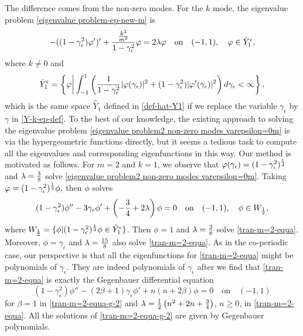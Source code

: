 \documentclass[1 [leqno, 11pt]{amsart}
\numberwithin{equation}{section}
\let\ep=\epsilon
\begin{document}
\begin{CJK*}{GBK}{song}
The difference comes from the non-zero modes. For the $k$ mode, the eigenvalue problem \eqref{eigenvalue problem-ep-new-m}
is
\begin{equation}\label{eigenvalue problem2 non-zero modes varepsilon=0m}
-((1-\gamma_\ep^2)\varphi')'+{{k^2\over m^2}\over1-\gamma_\ep^2}\varphi =2\lambda\varphi \quad \text{on}\quad (-1,1),\quad\varphi\in \hat Y_1^\ep,
\end{equation}
where $k\neq0$ and
\begin{align}\label{Y-k-ep-def}
\hat Y_1^\ep=\left\{\varphi\bigg|\int_{-1}^1\left({1\over1-\gamma_\ep^2}|\varphi(\gamma_\ep)|^2+(1-\gamma_\ep^2)|\varphi'(\gamma_\ep)|^2\right)d\gamma_\ep
<\infty \right\},
\end{align}
which is the same space
 $\hat Y_1$ defined in \eqref{def-hat-Y1} if we replace the variable $\gamma_\ep$ by $\gamma$ in \eqref{Y-k-ep-def}.
To the best of our knowledge, the existing approach to solving the eigenvalue problem \eqref{eigenvalue problem2 non-zero modes varepsilon=0m} is via the hypergeometric functions directly, but it seems a tedious task to compute all the eigenvalues and corresponding eigenfunctions in this way. Our method is motivated as follows. For $m=2$ and $k=1$, we observe that $\varphi(\gamma_\ep)=(1-\gamma_\ep^2)^{1\over 4}$ and $\lambda={3\over 8}$ solve \eqref{eigenvalue problem2 non-zero modes varepsilon=0m}. Taking
$
\varphi=(1-\gamma_\ep^2)^{1\over4}\phi,
$
then $\phi$ solves
\begin{equation}\label{tran-m=2-equa}
(1-\gamma_\ep^2)\phi''-3\gamma_\ep\phi'+\left(-{3\over4}+2\lambda\right)\phi =0 \quad \text{on}\quad (-1,1),\quad\phi\in W_{1\over 2},
\end{equation}
where $W_{1\over 2}=\{\phi|(1-\gamma_\ep^2)^{1\over4}\phi\in\hat Y_1^\ep\}$.
Then $\phi=1$ and $\lambda={3\over 8}$ solve \eqref{tran-m=2-equa}. Moreover, $\phi=\gamma_\ep$ and $\lambda={15\over 8}$ also solve \eqref{tran-m=2-equa}. As in the co-periodic case, our perspective is that all the eigenfunctions for \eqref{tran-m=2-equa}  might be polynomials of $\gamma_\ep$. They are indeed polynomials of $\gamma_\ep$ after we find that \eqref{tran-m=2-equa} is exactly the Gegenbauer differential equation
\begin{equation}\label{tran-m=2-equa-g-2}
(1-\gamma_\ep^2)\phi''-(2\beta+1)\gamma_\ep\phi'+n(n+2\beta)\phi =0 \quad \text{on}\quad (-1,1)
\end{equation}
for $\beta=1$ in \eqref{tran-m=2-equa-g-2} and $\lambda={1\over2} \left(n^2+2n+{3\over4}\right)$, $n\geq0$, in \eqref{tran-m=2-equa}. All the solutions of \eqref{tran-m=2-equa-g-2} are given by  Gegenbauer polynomials.

\end{CJK*}
\end{document}

